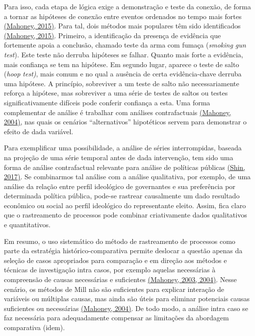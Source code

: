 Para isso, cada etapa de lógica exige a demonstração e teste da conexão,
de forma a tornar as hipóteses de conexão entre eventos ordenados no
tempo mais fortes
\href{https://www.zotero.org/google-docs/?ubVM0S}{(Mahoney, 2015)}. Para
tal, dois métodos mais populares têm sido identificados
\href{https://www.zotero.org/google-docs/?rUYZC8}{(Mahoney, 2015)}.
Primeiro, a identificação da presença de evidência que fortemente apoia
a conclusão, chamado teste da arma com fumaça (\emph{smoking gun test}).
Este teste não derruba hipóteses se falhar. Quanto mais forte a
evidência, mais confiança se tem na hipótese. Em segundo lugar, aparece
o teste de salto (\emph{hoop test)}, mais comum e no qual a ausência de
certa evidência-chave derruba uma hipótese. A princípio, sobreviver a um
teste de salto não necessariamente reforça a hipótese, mas sobreviver a
uma série de testes de saltos ou testes significativamente difíceis pode
conferir confiança a esta. Uma forma complementar de análise é trabalhar
com análises contrafactuais
\href{https://www.zotero.org/google-docs/?Sa5wGf}{(Mahoney, 2004)}, nas
quais os cenários ``alternativos'' hipotéticos servem para demonstrar o
efeito de dada variável.

Para exemplificar uma possibilidade, a análise de séries interrompidas,
baseada na projeção de uma série temporal antes de dada intervenção, tem
sido uma forma de análise contrafactual relevante para análise de
políticas públicas
\href{https://www.zotero.org/google-docs/?XYqd3d}{(Shin, 2017)}. Se
combinarmos tal análise com a análise qualitativa, por exemplo, de uma
análise da relação entre perfil ideológico de governantes e sua
preferência por determinada política pública, pode-se rastrear
causalmente um dado resultado econômico ou social ao perfil ideológico
do representante eleito. Assim, fica claro que o rastreamento de
processos pode combinar criativamente dados qualitativos e
quantitativos.

Em resumo, o uso sistemático do método de rastreamento de processos como
parte da estratégia histórico-comparativa permite deslocar a questão
apenas da seleção de casos apropriados para comparação e em direção aos
métodos e técnicas de investigação intra casos, por exemplo aquelas
necessárias à compreensão de causas necessárias e suficientes
\href{https://www.zotero.org/google-docs/?RSkbZj}{(Mahoney, 2003,
2004)}. Nesse cenário, os métodos de Mill não são suficientes para
explicar interação de variáveis ou múltiplas causas, mas ainda são úteis
para eliminar potenciais causas suficientes ou necessárias
\href{https://www.zotero.org/google-docs/?CV6Ref}{(Mahoney, 2004)}. De
todo modo, a análise intra caso se faz necessária para adequadamente
compensar as limitações da abordagem comparativa (idem).

